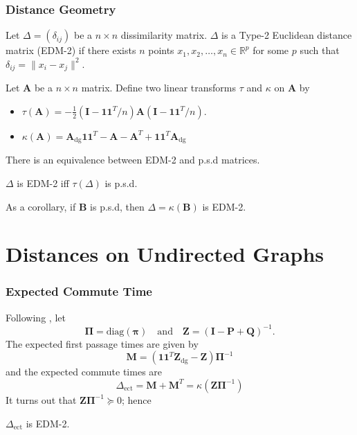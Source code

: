 \documentclass[professionalfonts, hyperref={pdfpagelabels=false,
  colorlinks=true, linkcolor=purple}]{beamer}
\begin{document}
\begin{frame}
  \frametitle{Distance Geometry}
  \begin{definition}
    \label{def:2}
    Let $\Delta = (\delta_{ij})$ be a $n \times n$ dissimilarity
    matrix. $\Delta$ is a Type-2 Euclidean distance matrix
    (\alert{EDM-2}) if there exists $n$ points $x_1, x_2, \dots, x_n
    \in \mathbb{R}^{p}$ for some $p$ such that $\delta_{ij} = \| x_i -
    x_j \|^2$.
  \end{definition}
  Let $\mathbf{A}$ be a $n \times n$ matrix. Define two
  linear transforms $\tau$ and $\kappa$ on $\mathbf{A}$ by 
  \begin{itemize}
  \item $\tau(\mathbf{A}) = -\tfrac{1}{2} (\mathbf{I} -
    \mathbf{1}\mathbf{1}^{T}/n) \mathbf{A} (\mathbf{I} -
    \mathbf{1}\mathbf{1}^{T}/n)$.
  \item $\kappa(\mathbf{A}) =
    \mathbf{A}_{\mathrm{dg}}\mathbf{1}\mathbf{1}^{T} - \mathbf{A}
    - \mathbf{A}^{T} + \mathbf{1}\mathbf{1}^{T} \mathbf{A}_{\mathrm{dg}}$
  \end{itemize}
  There is an equivalence between EDM-2 and p.s.d matrices.
  \begin{theorem}
    \label{thm:1}
    $\Delta$ is EDM-2 iff $\tau(\Delta)$ is p.s.d.
  \end{theorem}
  As a corollary, if $\mathbf{B}$ is p.s.d, then
  $\Delta = \kappa(\mathbf{B})$ is EDM-2.
\end{frame}
\section{Distances on Undirected Graphs}
\begin{frame}
  \frametitle{Expected Commute Time}
  Following \cite{kemeny83:_finit_markov_chain}, let
  \begin{equation*}
    \bm{\Pi} = \mathrm{diag}(\bm{\pi}) \quad \text{and} \quad
    \mathbf{Z} = (\mathbf{I} - \mathbf{P} + \mathbf{Q})^{-1}.
  \end{equation*}
  The expected first passage times are given by
  \begin{equation*}
    \mathbf{M} = (\mathbf{1}\mathbf{1}^{T}\mathbf{Z}_{\mathrm{dg}} -
    \mathbf{Z})\bm{\Pi}^{-1} 
  \end{equation*}
  and the expected commute times are
  \begin{equation*}
    \Delta_{\mathrm{ect}} = \mathbf{M} + \mathbf{M}^{T} =
    \kappa(\mathbf{Z}\bm{\Pi}^{-1})
  \end{equation*}
  It turns out that $\mathbf{Z}\bm{\Pi}^{-1} \succeq
  0$; hence 

  \vskip10pt \alert{$\Delta_{\mathrm{ect}}$ is EDM-2}.
\end{frame}
\end{document}
